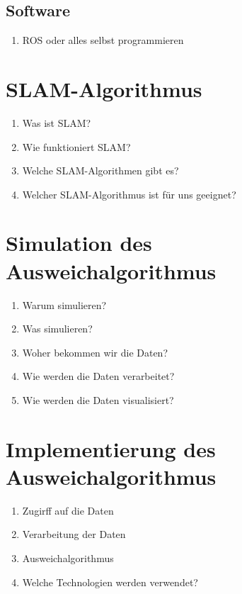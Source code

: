 \documentclass[12pt]{article}
\begin{document}
\subsection{Software}
\begin{enumerate}
    \item ROS oder alles selbst programmieren\\
\end{enumerate}

\section{SLAM-Algorithmus}

\begin{enumerate}
    \item Was ist SLAM?\\
    \item Wie funktioniert SLAM?\\
    \item Welche SLAM-Algorithmen gibt es?\\
    \item Welcher SLAM-Algorithmus ist für uns geeignet?\\

\end{enumerate}
\section{Simulation des Ausweichalgorithmus}

\begin{enumerate}
    \item Warum simulieren?\\
    \item Was simulieren?\\
    \item Woher bekommen wir die Daten?\\
    \item Wie werden die Daten verarbeitet?\\
    \item Wie werden die Daten visualisiert?\\
\end{enumerate}

\section{Implementierung des Ausweichalgorithmus}

\begin{enumerate}
    \item Zugirff auf die Daten\\
    \item Verarbeitung der Daten\\
    \item Ausweichalgorithmus\\
    \item Welche Technologien werden verwendet?\\
\end{enumerate}
\end{document}
